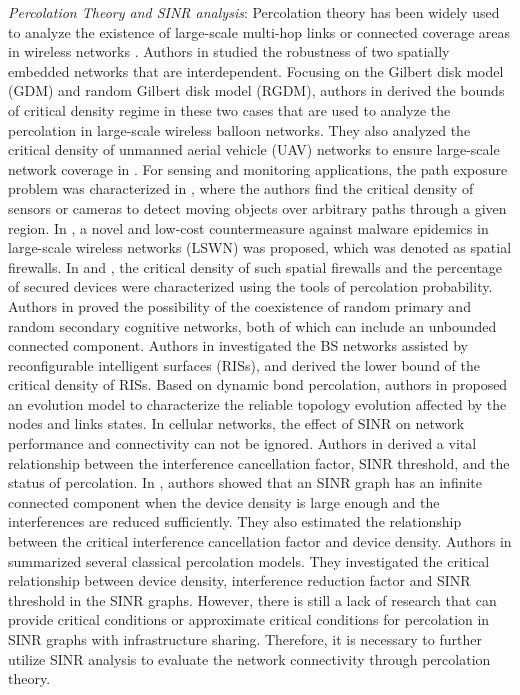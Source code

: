 \documentclass[final]{IEEEtran}
\begin{document}
\indent \textit{Percolation Theory and SINR analysis}: Percolation theory has been widely used to analyze the existence of large-scale multi-hop links or connected coverage areas in wireless networks \cite{haenggi2012stochastic, elsawy2023tutorial}. Authors in \cite{zhang2018robustness} studied the robustness of two spatially embedded networks that are interdependent. Focusing on the Gilbert disk model (GDM) and random Gilbert disk model (RGDM), authors in \cite{anjum2019percolation} derived the bounds of critical density regime in these two cases that are used to analyze the percolation in large-scale wireless balloon networks. They also analyzed the critical density of unmanned aerial vehicle (UAV) networks to ensure large-scale network coverage in \cite{9049663}. For sensing and monitoring applications, the path exposure problem was characterized in \cite{8794718,liu2012optimal}, where the authors find the critical density of sensors or cameras to detect moving objects over arbitrary paths through a given region. In \cite{9214384}, a novel and low-cost countermeasure against malware epidemics in large-scale wireless networks (LSWN) was proposed, which was denoted as spatial firewalls. In \cite{9214384} and \cite{9240972}, the critical density of such spatial firewalls and the percentage of secured devices were characterized using the tools of percolation probability. Authors in \cite{yemini2019simultaneous} proved the possibility of the coexistence of random primary and random secondary cognitive networks, both of which can include an unbounded connected component. Authors in \cite{wu2023connectivity} investigated the BS networks assisted by reconfigurable intelligent surfaces (RISs), and derived the lower bound of the critical density of RISs. Based on dynamic bond percolation, authors in \cite{han2024dynamic} proposed an evolution model to characterize the reliable topology evolution affected by the nodes and links states. In cellular networks, the effect of SINR on network performance and connectivity can not be ignored. Authors in \cite{jahnel2022sinr} derived a vital relationship between the interference cancellation factor, SINR threshold, and the status of percolation. In \cite{tobias2020signal}, authors showed that an SINR graph has an infinite connected component when the device density is large enough and the interferences are reduced sufficiently. They also estimated the relationship between the critical interference cancellation factor and device density. Authors in \cite{elsawy2023tutorial} summarized several classical percolation models. They investigated the critical relationship between device density, interference reduction factor and SINR threshold in the SINR graphs. However, there is still a lack of research that can provide critical conditions or approximate critical conditions for percolation in SINR graphs with infrastructure sharing. Therefore, it is necessary to further utilize SINR analysis to evaluate the network connectivity through percolation theory.
\end{document}
